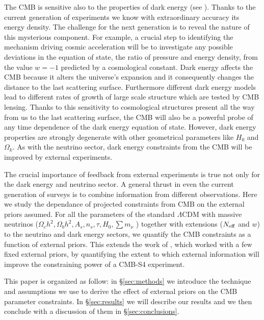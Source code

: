 \documentclass[aps,prd,reprint,superscriptaddress]{revtex4-1}
\newcommand\refsec[1]{\S\ref{sec:#1}}
\begin{document}
The CMB is sensitive also to the properties of dark energy (see \cite{2010MNRAS.405.2639J}). Thanks to the current generation of experiments we know with extraordinary accuracy its energy density. The challenge for the next generation is to reveal the nature of this mysterious component. For example, a crucial step to identifying the mechanism driving cosmic acceleration will be to investigate any possible deviations in the equation of state, the ratio of pressure and energy density, from the value $w=-1$ predicted by a cosmological constant. 
Dark energy affects the CMB because it alters the universe's expansion and it consequently changes the distance to the last scattering surface. Furthermore different dark energy models lead to different rates of growth of large scale structure which are tested by CMB lensing. Thanks to this sensitivity to cosmological structures present all the way from us to the last scattering surface, the CMB will also be a powerful probe of any time dependence of the dark energy equation of state.
However, dark energy properties are strongly degenerate with other geometrical parameters like $H_{0}$ and $\Omega_{k}$. As with the neutrino sector, dark energy constraints from the CMB 
will be improved by external experiments.

The crucial importance of feedback from external experiments is true not only for the dark energy and neutrino sector. A general thrust in even the current generation of surveys is to combine information from different observations. %
Here we study the dependance of projected constraints from CMB on the external priors assumed.  For all the parameters of the standard $\Lambda$CDM with massive neutrinos ($\Omega_ch^2, \Omega_bh^2, A_s, n_s, \tau, H_0, \sum m_\nu$ ) together with extensions ($N_{\rm eff}$ and $w$) to the neutrino and dark energy sectors, we quantify the CMB constraints as a function of external priors. This extends the work of \citet{wu:2014}, which worked with a few fixed external priors, by quantifying the extent to which external information will improve the constraining power of a CMB-S4 experiment.

This paper is organized as follow: in \refsec{methods} we introduce the technique and assumptions we use to derive the effect of external priors on the CMB parameter constraints. In \refsec{results} we will describe our results and we then conclude with a discussion of them in \refsec{conclusions}.
\end{document}
